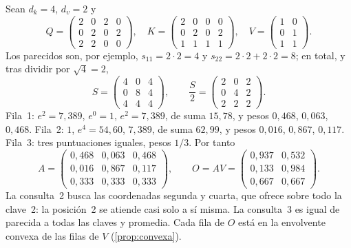 \begin{ejemplo}\label{ej:tres}
Sean $d_k=4$, $d_v=2$ y
\[
Q=\begin{pmatrix}2&0&2&0\\0&2&0&2\\2&2&0&0\end{pmatrix},\quad
K=\begin{pmatrix}2&0&0&0\\0&2&0&2\\1&1&1&1\end{pmatrix},\quad
V=\begin{pmatrix}1&0\\0&1\\1&1\end{pmatrix}.
\]
Los parecidos son, por ejemplo, $s_{11}=2\cdot 2=4$ y $s_{22}=2\cdot 2+2\cdot 2=8$; en total, y tras dividir por $\sqrt4=2$,
\[
S=\begin{pmatrix}4&0&4\\0&8&4\\4&4&4\end{pmatrix},\qquad
\frac{S}{2}=\begin{pmatrix}2&0&2\\0&4&2\\2&2&2\end{pmatrix}.
\]
Fila~1: $e^{2}=7{,}389$, $e^{0}=1$, $e^{2}=7{,}389$, de suma $15{,}78$, y pesos $0{,}468$, $0{,}063$, $0{,}468$. Fila~2: $1$, $e^{4}=54{,}60$, $7{,}389$, de suma $62{,}99$, y pesos $0{,}016$, $0{,}867$, $0{,}117$. Fila~3: tres puntuaciones iguales, pesos $1/3$. Por tanto
\[
A=\begin{pmatrix}0{,}468&0{,}063&0{,}468\\0{,}016&0{,}867&0{,}117\\0{,}333&0{,}333&0{,}333\end{pmatrix},\qquad
O=AV=\begin{pmatrix}0{,}937&0{,}532\\0{,}133&0{,}984\\0{,}667&0{,}667\end{pmatrix}.
\]
La consulta~2 busca las coordenadas segunda y cuarta, que ofrece sobre todo la clave~2: la posición~2 se atiende casi solo a sí misma. La consulta~3 es igual de parecida a todas las claves y promedia. Cada fila de $O$ está en la envolvente convexa de las filas de $V$ (\cref{prop:convexa}).
\end{ejemplo}

